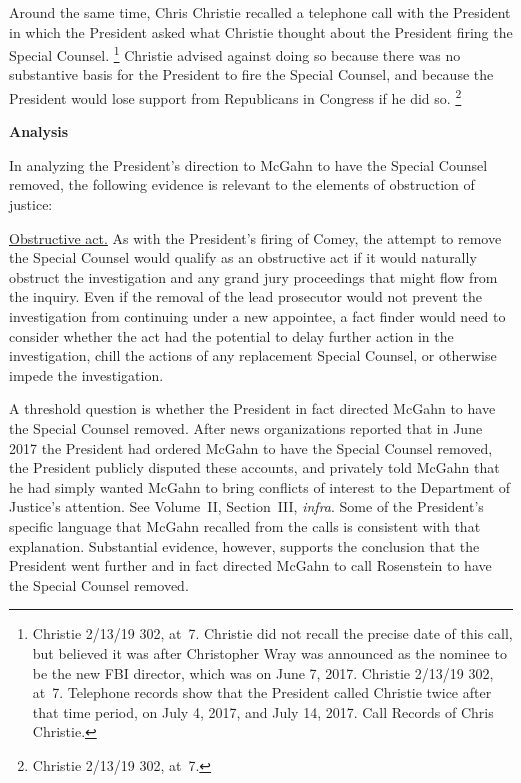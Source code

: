 {Around the same time, Chris Christie recalled a telephone call with the President in which the President asked what Christie thought about the President firing the Special Counsel.%
\footnote{Christie 2/13/19 302, at~7.
Christie did not recall the precise date of this call, but believed it was after Christopher Wray was announced as the nominee to be the new FBI director, which was on June 7, 2017.
Christie 2/13/19 302, at~7.
Telephone records show that the President called Christie twice after that time period, on July 4, 2017, and July 14, 2017.
Call Records of Chris Christie.}
Christie advised against doing so because there was no substantive basis for the President to fire the Special Counsel, and because the President would lose support from Republicans in Congress if he did so.%
\footnote{Christie 2/13/19 302, at~7.}

\begin{center}
\textbf{Analysis}
\end{center}

In analyzing the President's direction to McGahn to have the Special Counsel removed, the following evidence is relevant to the elements of obstruction of justice:

\underline{Obstructive act.}
As with the President's firing of Comey, the attempt to remove the Special Counsel would qualify as an obstructive act if it would naturally obstruct the investigation and any grand jury proceedings that might flow from the inquiry.
Even if the removal of the lead prosecutor would not prevent the investigation from continuing under a new appointee, a fact finder would need to consider whether the act had the potential to delay further action in the investigation, chill the actions of any replacement Special Counsel, or otherwise impede the investigation.

A threshold question is whether the President in fact directed McGahn to have the Special Counsel removed.
After news organizations reported that in June 2017 the President had ordered McGahn to have the
Special Counsel removed, the President publicly disputed these accounts, and privately told McGahn that he had simply wanted McGahn to bring conflicts of interest to the Department of Justice's attention.
See Volume~II, Section~III, \textit{infra}.
Some of the President's specific language that McGahn recalled from the calls is consistent with that explanation.
Substantial evidence, however, supports the conclusion that the President went further and in fact directed McGahn to call Rosenstein to have the Special Counsel removed.

}

